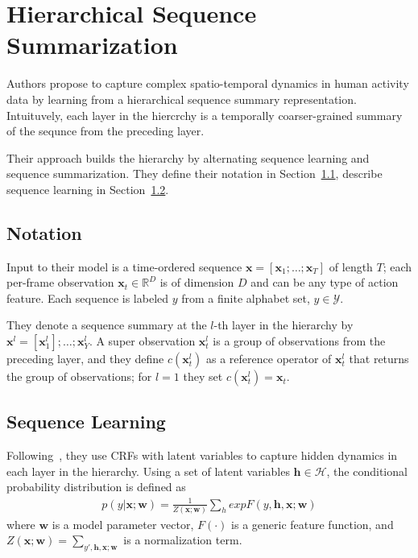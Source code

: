 \documentclass[10pt,twocolumn,letterpaper]{article}
\begin{document}
\section{Hierarchical Sequence Summarization}\label{s1}

Authors propose to capture complex spatio-temporal dynamics in human activity data by learning from a hierarchical sequence summary representation. Intuituvely, each layer in the hiercrchy is a temporally coarser-grained summary of the sequnce from the preceding layer.

Their approach builds the hierarchy by alternating sequence learning and sequence summarization. They define their notation in Section~\ref{s2}, describe sequence learning in Section~\ref{s3}.

\subsection{Notation}\label{s2}

Input to their model is a time-ordered sequence $\mathbf{x} = [\mathbf{x}_1;\dots;\mathbf{x}_T]$ of length $T$; each per-frame observation $\mathbf{x}_t \in \mathbb{R}^D$ is of dimension $D$ and can be any type of action feature. Each sequence is labeled $y$ from a finite alphabet set, $y \in \mathcal{Y}$.

They denote a sequence summary at the $l$-th layer in the hierarchy by $\mathbf{x}^l = [\mathbf{x}_1^l];\dots;\mathbf{x}_Y^l$. A super observation $\mathbf{x}_t^l$ is a group of observations from the preceding layer, and they define $c(\mathbf{x}_t^l)$ as a reference operator of $\mathbf{x}_t^l$ that returns the group of observations; for $l = 1$ they set $c(\mathbf{x}_t^l) = \mathbf{x}_t$.

\subsection{Sequence Learning}\label{s3}

Following~\cite{Hidden}, they use CRFs with latent variables to capture hidden dynamics in each layer in the hierarchy. Using a set of latent variables $\mathbf{h} \in \mathcal{H}$, the conditional probability distribution is defined as~\cite{action}\\
\begin{gather}
p(y|\mathbf{x};\mathbf{w}) = \frac{1}{Z(\mathbf{x};\mathbf{w})}\sum_hexpF(y,\mathbf{h},\mathbf{x};\mathbf{w})
\end{gather}
where $\mathbf{w}$ is a model parameter vector, $F(\cdot)$ is a generic feature function, and $Z(\mathbf{x};\mathbf{w}) = \sum_{y',\mathbf{h},\mathbf{x};\mathbf{w}}$ is a normalization term.
\end{document}
